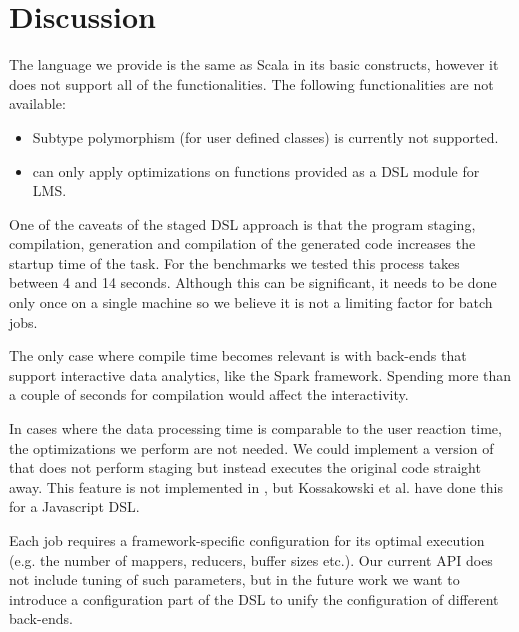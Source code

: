 \section{Discussion}
\label{sec:discussion}
 
The language we provide is the same as Scala in its basic constructs, however it
does not support all of the functionalities. The following functionalities are
not available:
\begin{itemize}
\item Subtype polymorphism (for user defined classes) is currently not
supported.
\item \tool can only apply optimizations on functions provided as a DSL module
for LMS.
\end{itemize}



One of the caveats of the staged DSL approach is that the program staging,
compilation, generation and compilation of the generated code increases the
startup time of the task. For the benchmarks we tested this process takes
between 4 and 14 seconds. Although this can be significant, it needs
to be done only once on a single machine so we believe it is not a limiting
factor for batch jobs.

The only case where compile time becomes relevant is with back-ends that support
interactive data analytics, like the Spark framework. Spending more than a
couple of seconds for compilation would affect the interactivity.

In cases where the data processing time is comparable to the user reaction
time, the optimizations we perform are not needed. We could implement a version
of \tool that does not perform staging but instead executes the original code
straight away.
This feature is not
implemented in \tool, but Kossakowski et al. \cite{greg} have done this for a
Javascript DSL.

Each job requires a framework-specific configuration for its optimal execution
(e.g. the number of mappers, reducers, buffer sizes etc.). Our current API does
not include tuning of such parameters, but in the future work we want to
introduce a configuration part of the DSL to unify the configuration of
different back-ends.
